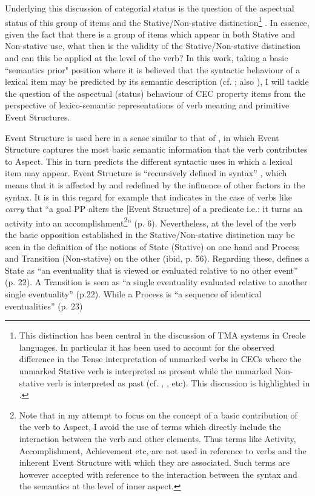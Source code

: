 Underlying this discussion of categorial status is the question of the
aspectual status of this group of items and the Stative\slash Non-stative
distinction\footnote{This distinction has been central in the
  discussion of TMA systems in Creole languages.  In particular it has
  been used to account for the observed difference in the Tense
  interpretation of unmarked verbs in CECs where the unmarked Stative
  verb is interpreted as present while the unmarked Non-stative verb
  is interpreted as past (cf. \citealt{Bickerton1975 },  \citealt{Winford1993}, etc). 
  This discussion is highlighted in   .} . 
  In essence, given the fact that there is a group of
items which appear in both Stative and Non-stative use, what then is
the validity of the Stative\slash Non-stative distinction and can this be
applied at the level of the verb?  In this work, taking a basic
``semantics prior" position where it is believed that the syntactic
behaviour of a lexical item may be predicted by its semantic
description (cf. \citealt{Dixon1977}; also \citealt{Levin1993}), I
will tackle the question of the aspectual (status) behaviour of CEC
property items from the perspective of lexico-semantic representations
of verb meaning and primitive Event Structures.

Event Structure is used here in a sense similar to that
of \citet{Pustejovsky1988,Pustejovsky1991},  in which Event Structure captures the most basic semantic
information that the verb contributes to Aspect. This in turn predicts
the different syntactic uses in which a lexical item may appear.
Event Structure is ``recursively defined in syntax'' \citet[55]{Pustejovsky1991}, which means that it is affected by and redefined by the
influence of other factors in the syntax.  It is in this regard for
example that \citet{MacDonald2008} indicates in the case of verbs like
\textit{carry}  that ``a goal PP alters the [Event Structure] of a predicate
i.e.: it turns an activity into an accomplishment\footnote{Note that
  in my attempt to focus on the concept of a basic contribution of the
  verb to Aspect, I avoid the use of terms which directly include the
  interaction between the verb and other elements. Thus terms like
  Activity, Accomplishment, Achievement etc, are not used in reference
  to verbs and the inherent Event Structure with which they are
  associated. Such terms are however accepted with reference to the
  interaction between the syntax and the semantics at the level of
  inner aspect.}'' (p. 6).  Nevertheless, at the level of the verb
the basic opposition established in the Stative\slash Non-stative
distinction may be seen in the definition of the notions of State
(Stative) on one hand and Process and Transition (Non-stative) on the
other (ibid, p. 56).  Regarding these, \citet{Pustejovsky1988} defines
a State as ``an eventuality that is viewed or evaluated relative to no
other event'' (p. 22).  A Transition is seen as ``a single eventuality
evaluated relative to another single eventuality'' (p.22).  While a
Process is ``a sequence of identical eventualities'' (p. 23)

